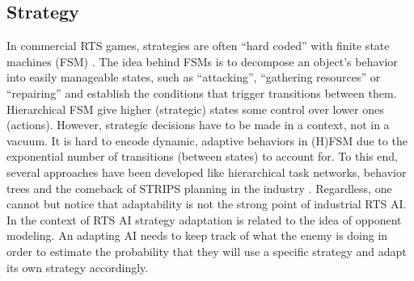 \documentclass[journal]{IEEEtran}
\begin{document}


\subsection{Strategy}

In commercial RTS games, strategies are often ``hard coded'' with finite state machines (FSM) \cite{FSM_AIGameProgWisdom2003}. The idea behind FSMs is to decompose an object's behavior into easily manageable states, such as ``attacking'', ``gathering resources'' or ``repairing'' and establish the conditions that trigger transitions between them. Hierarchical FSM give higher (strategic) states some control over lower ones (actions). However, strategic decisions have to be made in a context, not in a vacuum. It is hard to encode dynamic, adaptive behaviors in (H)FSM due to the exponential number of transitions (between states) to account for. To this end, several approaches have been developed like hierarchical task networks, behavior trees and the comeback of STRIPS \cite{FikesSTRIPS} planning in the industry \cite{orkinGDC_FEAR}. Regardless, one cannot but notice that adaptability is not the strong point of industrial RTS AI. In the context of RTS AI strategy adaptation is related to the idea of opponent modeling. An adapting AI needs to keep track of what the enemy is doing in order to estimate the probability that they will use a specific strategy and adapt its own strategy accordingly. 
\end{document}
